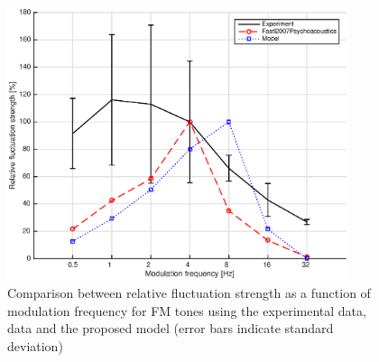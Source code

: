 \documentclass[a4paper]{article}
\begin{document}
\begin{figure}[H]
    \centering
    \includegraphics[height=8cm]{img/FM_tones-fm-results-Rodrigo-comparison}
    \caption{Comparison between relative fluctuation strength as a function of
        modulation frequency for FM tones using the experimental data,
        \citeauthor{Fastl2007Psychoacoustics} data and the proposed model
        (error bars indicate standard deviation)}
\end{figure}
\end{document}
